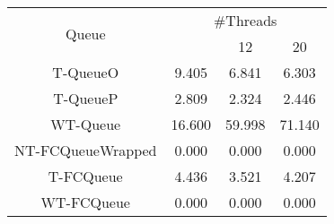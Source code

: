 \begin{tabular}{|c|c|c|c|}
\hline
\multirow{2}{*}{Queue} & \multicolumn{3}{c|}{\#Threads}\\\cline{2-4}& \quad 4 & 12 & 20\\
\hline
\hline
T-QueueO & 9.405 & 6.841 & 6.303\\
T-QueueP & 2.809 & 2.324 & 2.446\\
WT-Queue & 16.600 & 59.998 & 71.140\\
NT-FCQueueWrapped & 0.000 & 0.000 & 0.000\\
T-FCQueue & 4.436 & 3.521 & 4.207\\
WT-FCQueue & 0.000 & 0.000 & 0.000\\
\hline\end{tabular}
